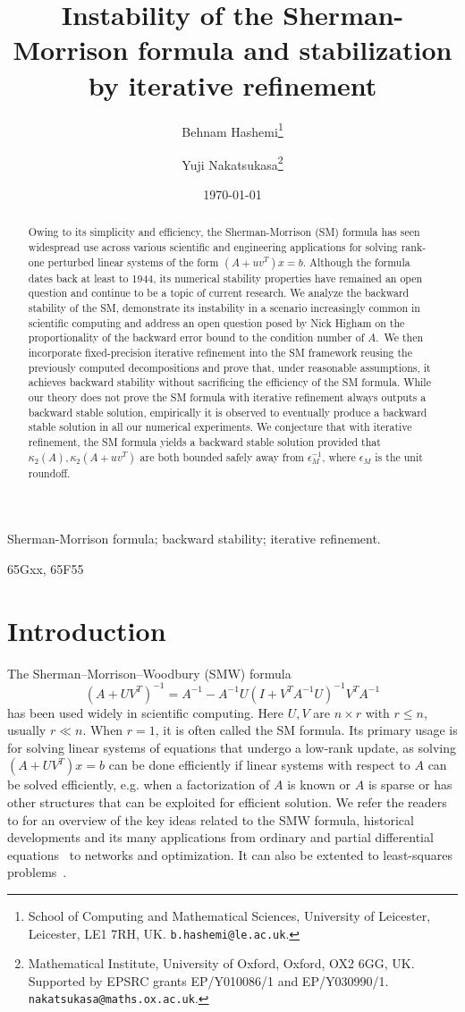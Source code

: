 \documentclass{siamltex}
\title{Instability of the Sherman-Morrison formula and stabilization by iterative refinement}
\author{Behnam Hashemi\thanks{School of Computing and Mathematical Sciences, University of Leicester, Leicester, LE1 7RH, UK. {\tt b.hashemi@le.ac.uk}.}
\and 
Yuji Nakatsukasa\thanks{Mathematical Institute, University of Oxford, Oxford, OX2 6GG, UK. Supported by EPSRC grants EP/Y010086/1 and EP/Y030990/1. {\tt nakatsukasa@maths.ox.ac.uk}.}
}
\newcommand{\eps}{\epsilon}
\begin{document}
\maketitle
\date{\today}

\begin{abstract} 
Owing to its simplicity and efficiency, the Sherman-Morrison (SM) formula has seen widespread use across various scientific and engineering applications for solving rank-one perturbed linear systems of the form $(A+uv^T)x = b$. Although the formula dates back at least to 1944, its numerical stability properties have remained an open question and continue to be a topic of current research. We analyze the backward stability of the SM, demonstrate its instability in a scenario increasingly common in scientific computing and address an open question posed by Nick Higham on the proportionality of the backward error bound to the condition number of $A$.\ We then incorporate fixed-precision iterative refinement into the SM framework reusing the previously computed decompositions and prove that, under reasonable assumptions, it achieves backward stability without sacrificing the efficiency of the SM formula. 
While our theory does not prove 
the SM formula with iterative refinement always outputs a backward stable solution, empirically it is observed to eventually produce a backward stable solution in all our numerical experiments. 
We conjecture that with iterative refinement, the SM formula yields a backward stable solution provided that $\kappa_2(A), \kappa_2(A+uv^T)$ are both bounded safely away from $\eps_M^{-1}$, where $\eps_M$ is the unit roundoff.

\end{abstract}
\begin{keywords} 
Sherman-Morrison formula; backward stability; iterative refinement. \end {keywords}
\begin{AMS} 65Gxx, 65F55 \end{AMS}

\section{Introduction}
The Sherman--Morrison--Woodbury (SMW) formula
\[
    (A+UV^T)^{-1}= A^{-1} - A^{-1}U(I + V^T\!A^{-1}U)^{-1}V^T\! A^{-1}
\]
has been used widely in scientific computing. Here $U,V$ are $n\times r$ with $r\leq n$, usually $r\ll n$. 
When $r=1$, it is often called the SM formula. Its primary usage is for solving linear systems of equations that undergo a low-rank update, as solving 
$(A+UV^T)x=b$ can be done efficiently if linear systems 
with respect to $A$ can be solved efficiently, e.g. when a factorization of $A$ is known or $A$ is sparse or has other structures that can be exploited for efficient solution. 
We refer the readers to \cite{Hager89} for an overview of the key ideas related to the SMW formula, historical developments \cite{Duncan44, Woodbury50, Bartlett51, SM50} and its many applications from ordinary and partial differential equations~\cite{Fortunato21, Olver13} to networks and optimization. It can also be extented to least-squares problems~\cite{guttel2024sherman}. 
\end{document}
